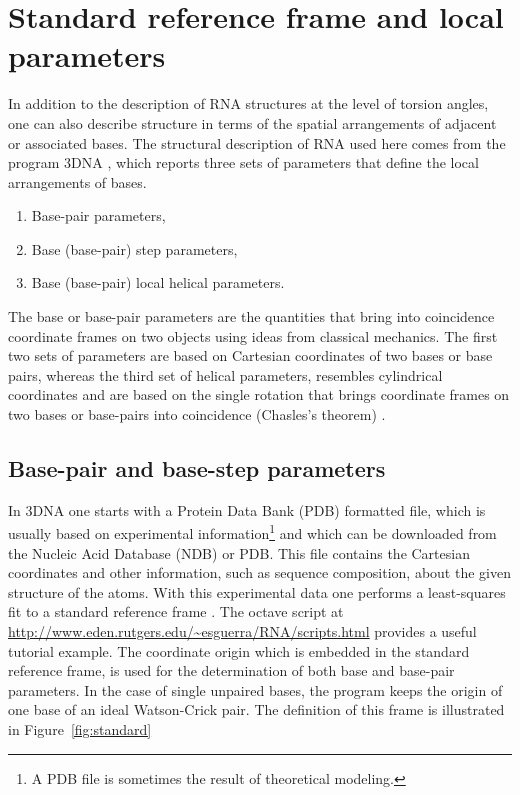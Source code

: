 \chapter{Standard reference frame and local parameters}
\label{appendix_1a}
  In   addition  to  the   description  of  RNA
structures  at the  level of  torsion  angles, one  can also  describe
structure  in  terms  of  the  spatial  arrangements  of  adjacent  or
associated bases.  The structural description  of RNA used  here comes
from the program \textsf{3DNA} \cite{lu2003}, which reports three sets
of parameters that define the local arrangements of bases.
\begin{enumerate}
\item Base-pair parameters,
\item Base (base-pair) step parameters,
\item Base (base-pair) local helical parameters.
\end{enumerate}
The base or  base-pair parameters are the quantities  that bring into
coincidence  coordinate  frames  on   two  objects  using  ideas  from
classical mechanics.
The first two sets of parameters are based on Cartesian coordinates of
two bases or  base pairs, whereas the third set  of helical parameters,
resembles cylindrical coordinates and are based on the single rotation
that  brings  coordinate  frames  on  two  bases  or  base-pairs  into
coincidence (Chasles's theorem) \cite{babcock1994}.

\section{Base-pair and base-step parameters}
In \textsf{3DNA} one  starts with a Protein Data  Bank (PDB) formatted
\cite{berman2000}  file,  which   is  usually  based  on  experimental
information\footnote{A PDB file is sometimes the result of theoretical
  modeling.}   and  which can  be  downloaded  from  the Nucleic  Acid
Database (NDB)  or PDB.  This file contains  the Cartesian coordinates
and other  information, such as sequence composition,  about the given
structure of  the atoms.  With  this experimental data one  performs a
least-squares fit to a  standard reference frame \cite{olson2001}. The
\textsf{octave}                        script                       at
\url{http://www.eden.rutgers.edu/~esguerra/RNA/scripts.html}   provides
a useful tutorial example.  The coordinate origin which is embedded in
the standard  reference frame, is  used for the determination  of both
base and base-pair parameters.  In  the case of single unpaired bases,
the  program keeps the  origin of  one base  of an  ideal Watson-Crick
pair.    The   definition   of    this   frame   is   illustrated   in
Figure~\ref{fig:standard}

